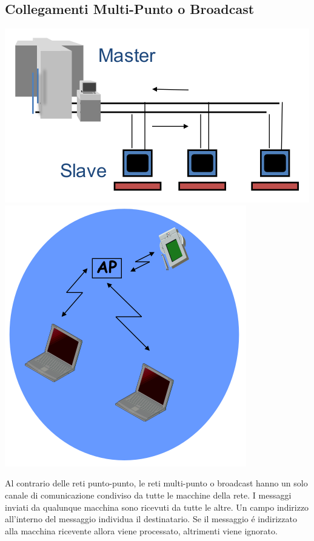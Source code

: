 \documentclass[12pt]{article}
\begin{document}
\subsection{Collegamenti Multi-Punto o Broadcast}\label{collegamenti-multi-punto-broadcast}
\begin{center}
	\includegraphics[scale=0.5]{introduzione-img2.png}
	\includegraphics[scale=0.35]{introduzione-img3.png}
\end{center}
Al contrario delle reti punto-punto, le reti multi-punto o broadcast hanno un solo canale di comunicazione condiviso da 
tutte le macchine della rete. I messaggi inviati da qualunque macchina sono ricevuti da tutte le altre. Un campo indirizzo 
all'interno del messaggio individua il destinatario. Se il messaggio \'e indirizzato alla macchina ricevente allora viene
processato, altrimenti viene ignorato.
\end{document}

